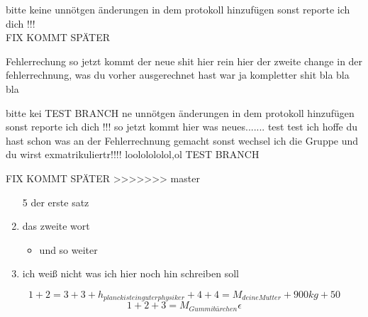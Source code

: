 \documentclass[a4paper]{scrartcl}
\begin{document}
		 \huge bitte keine unnötgen änderungen in dem protokoll hinzufügen sonst reporte ich dich !!!
		 \vspace{20pt}
		  \\ {\huge FIX KOMMT SPÄTER }


		 Fehlerrechung so jetzt kommt der neue shit hier rein
		 hier der zweite change in der fehlerrechnung, was du vorher ausgerechnet hast war ja kompletter shit
		 bla bla bla

		 \huge bitte kei TEST BRANCH ne unnötgen änderungen in dem protokoll hinzufügen sonst reporte ich dich !!!    so jetzt kommt hier was neues....... test test ich hoffe du hast schon was an der Fehlerrechnung gemacht sonst wechsel ich die Gruppe und du wirst exmatrikuliertr!!!! loololololol,ol
		 \huge  \huge \centering TEST BRANCH

		 \vspace{20pt} {\huge FIX KOMMT SPÄTER }
>>>>>>> master




		\begin{enumerate}
			\item[5] der erste satz
			\item das zweite wort
			\begin{itemize}
			\item und so weiter
			\end{itemize}
			\item ich weiß nicht was ich hier noch hin schreiben soll
		\end{enumerate}

	 $$1+2=3+3+h_{planck ist ein guter physiker}+4+4=M_{deine Mutter}+900 {kg}+50$$
	 \begin{equation}
	 1+2+3=M_{Gummibärchen}
	  \epsilon
	 \end{equation}
\end{document}
